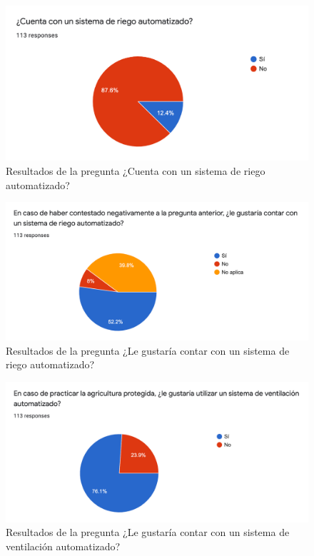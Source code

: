 \begin{figure}[!h]
	\centering
	\includegraphics[width=1\linewidth]{imagenes/encuesta/pregunta_3.png}
	\caption{Resultados de la pregunta ¿Cuenta con un sistema de riego automatizado?}
	\label{fig:pregunta_3_cuenta_con_sist_riego}
\end{figure}

\begin{figure}[!h]
	\centering
	\includegraphics[width=1\linewidth]{imagenes/encuesta/pregunta_4.png}
	\caption{Resultados de la pregunta ¿Le gustaría contar con un sistema de riego automatizado?}
	\label{fig:pregunta_4_quiere_sist_riego}
\end{figure}

\begin{figure}[!h]
	\centering
	\includegraphics[width=1\linewidth]{imagenes/encuesta/pregunta_5.png}
	\caption{Resultados de la pregunta ¿Le gustaría contar con un sistema de ventilación automatizado?}
	\label{fig:pregunta_5_quiere_sist_vent}
\end{figure}

